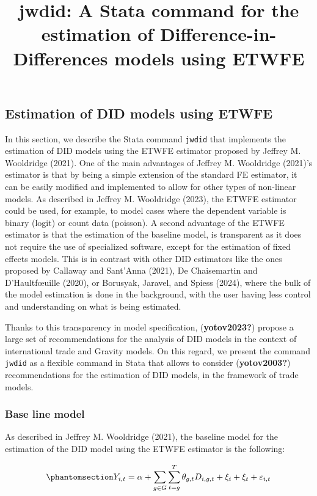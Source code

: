 \documentclass[
  letterpaper,
  DIV=11,
  numbers=noendperiod]{scrartcl}
\title{jwdid: A Stata command for the estimation of
Difference-in-Differences models using ETWFE}
\author{}
\date{}
\begin{document}
\maketitle

\subsection{Estimation of DID models using
ETWFE}\label{estimation-of-did-models-using-etwfe}

In this section, we describe the Stata command \texttt{jwdid} that
implements the estimation of DID models using the ETWFE estimator
proposed by Jeffrey M. Wooldridge (2021). One of the main advantages of
Jeffrey M. Wooldridge (2021)'s estimator is that by being a simple
extension of the standard FE estimator, it can be easily modified and
implemented to allow for other types of non-linear models. As described
in Jeffrey M. Wooldridge (2023), the ETWFE estimator could be used, for
example, to model cases where the dependent variable is binary (logit)
or count data (poisson). A second advantage of the ETWFE estimator is
that the estimation of the baseline model, is transparent as it does not
require the use of specialized software, except for the estimation of
fixed effects models. This is in contrast with other DID estimators like
the ones proposed by Callaway and Sant'Anna (2021), De Chaisemartin and
D'Haultfœuille (2020), or Borusyak, Jaravel, and Spiess (2024), where
the bulk of the model estimation is done in the background, with the
user having less control and understanding on what is being estimated.

Thanks to this transparency in model specification,
(\textbf{yotov2023?}) propose a large set of recommendations for the
analysis of DID models in the context of international trade and Gravity
models. On this regard, we present the command \texttt{jwdid} as a
flexible command in Stata that allows to consider (\textbf{yotov2003?})
recommendations for the estimation of DID models, in the framework of
trade models.

\subsubsection{Base line model}\label{base-line-model}

As described in Jeffrey M. Wooldridge (2021), the baseline model for the
estimation of the DID model using the ETWFE estimator is the following:

\begin{equation}\phantomsection\label{eq-b0}{Y_{i,t} = \alpha + \sum_{g \in G} \sum_{t=g}^{T} \theta_{g,t} D_{i,g,t} + \xi_i + \xi_t + \varepsilon_{i,t}
}\end{equation}
\end{document}
